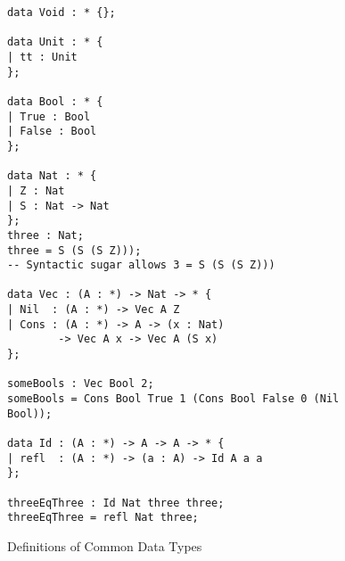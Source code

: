 \begin{figure}
\begin{lstlisting}[basicstyle={\ttfamily\small}]
data Void : * {};

data Unit : * {
| tt : Unit
};

data Bool : * {
| True : Bool
| False : Bool
};
 
data Nat : * {
| Z : Nat
| S : Nat -> Nat
};
three : Nat;
three = S (S (S Z)));
-- Syntactic sugar allows 3 = S (S (S Z)))

data Vec : (A : *) -> Nat -> * {
| Nil  : (A : *) -> Vec A Z
| Cons : (A : *) -> A -> (x : Nat)
        -> Vec A x -> Vec A (S x)
};

someBools : Vec Bool 2;
someBools = Cons Bool True 1 (Cons Bool False 0 (Nil Bool));

data Id : (A : *) -> A -> A -> * {
| refl  : (A : *) -> (a : A) -> Id A a a
};

threeEqThree : Id Nat three three;
threeEqThree = refl Nat three;
\end{lstlisting}
 \caption{Definitions of Common Data Types}
\label{fig:data-defs}
\end{figure}
